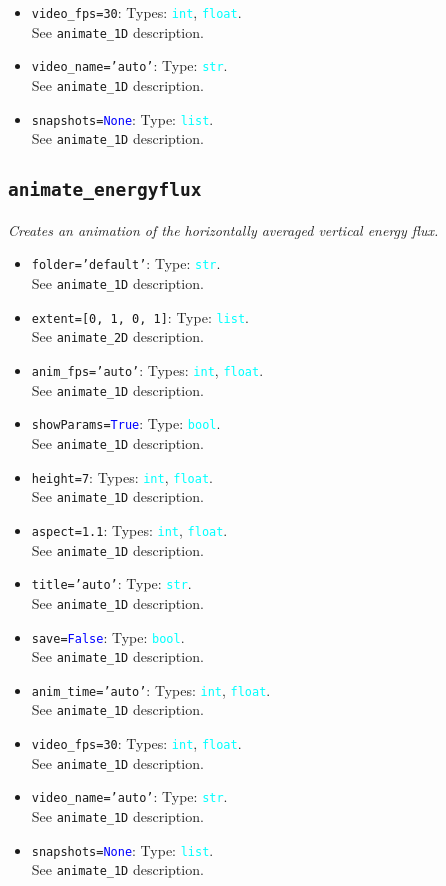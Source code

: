 \documentclass{article}
\newcommand{\ttt}[1]{\texttt{#1}}
\newcommand{\ptype}[1]{\texttt{\textcolor{cyan}{#1}}}
\newcommand{\cbl}[1]{\textcolor{blue}{#1}}
\newcommand{\cro}[1]{\textcolor{RedOrange}{#1}}
\newcommand{\cyo}[1]{\textcolor{YellowOrange}{#1}}
\begin{document}
\begin{itemize}
	\item \ttt{\cro{video\_fps}=30}: Types: \ptype{int}, \ptype{float}.\\See \ttt{animate\_1D} description.
	\item \ttt{\cro{video\_name}=\cyo{'auto'}}: Type: \ptype{str}.\\See \ttt{animate\_1D} description.
	\item \ttt{\cro{snapshots}=\cbl{None}}: Type: \ptype{list}.\\See \ttt{animate\_1D} description.
\end{itemize}

\subsection{\ttt{animate\_energyflux}}
\label{sec:animen}
\textit{Creates an animation of the horizontally averaged vertical energy flux.}
\begin{itemize}
	\item \ttt{\cro{folder}=\cyo{'default'}}: Type: \ptype{str}.\\See \ttt{animate\_1D} description.
	\item \ttt{\cro{extent}=[0, 1, 0, 1]}: Type: \ptype{list}.\\See \ttt{animate\_2D} description.
	\item \ttt{\cro{anim\_fps}=\cyo{'auto'}}: Types: \ptype{int}, \ptype{float}.\\See \ttt{animate\_1D} description.
	\item \ttt{\cro{showParams}=\cbl{True}}: Type: \ptype{bool}.\\See \ttt{animate\_1D} description.
	\item \ttt{\cro{height}=7}: Types: \ptype{int}, \ptype{float}.\\See \ttt{animate\_1D} description.
	\item \ttt{\cro{aspect}=1.1}: Types: \ptype{int}, \ptype{float}.\\See \ttt{animate\_1D} description.
	\item \ttt{\cro{title}=\cyo{'auto'}}: Type: \ptype{str}.\\See \ttt{animate\_1D} description.
	\item \ttt{\cro{save}=\cbl{False}}: Type: \ptype{bool}.\\See \ttt{animate\_1D} description.
	\item \ttt{\cro{anim\_time}=\cyo{'auto'}}: Types: \ptype{int}, \ptype{float}.\\See \ttt{animate\_1D} description.
	\item \ttt{\cro{video\_fps}=30}: Types: \ptype{int}, \ptype{float}.\\See \ttt{animate\_1D} description.
	\item \ttt{\cro{video\_name}=\cyo{'auto'}}: Type: \ptype{str}.\\See \ttt{animate\_1D} description.
	\item \ttt{\cro{snapshots}=\cbl{None}}: Type: \ptype{list}.\\See \ttt{animate\_1D} description.
\end{itemize}
\end{document}
